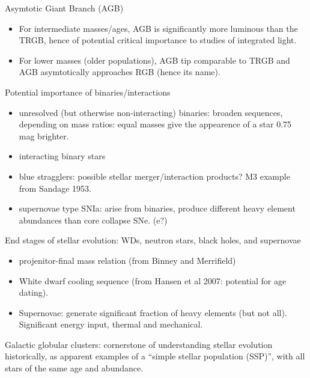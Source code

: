 \documentclass{article}
\begin{document}
    \item Asymtotic Giant Branch (AGB)
        \begin{itemize}
            \item For intermediate masses/ages, AGB is significantly more
                luminous than the TRGB, hence of potential critical importance
                to studies of integrated light.
            \item For lower masses (older populations), AGB tip comparable
                to TRGB and AGB asymtotically approaches RGB (hence its name).
        \end{itemize}
    \item Potential importance of binaries/interactions
        \begin{itemize}
            \item unresolved (but otherwise non-interacting) binaries:
                broaden sequences, depending on mass ratios: equal masses
                give the appearence of a star 0.75 mag brighter.
            \item interacting binary stars
            \item blue stragglers: possible stellar merger/interaction products?
                {M3 example} from Sandage 1953.
            \item supernovae type SNIa: arise from binaries, produce different
                heavy element abundances than core collapse SNe. (e?)
        \end{itemize}
    \item End stages of stellar evolution:
        WDs, neutron stars, black holes, and supernovae
        \begin{itemize}
            \item {projenitor-final mass relation}
                (from Binney and Merrifield)
            \item {White dwarf cooling sequence}
                (from {Hansen et al 2007}: potential for
                age dating).
            \item Supernovae: generate significant fraction of heavy elements
                (but not all). Significant energy input, thermal and mechanical.
        \end{itemize}
    \item Galactic globular clusters: cornerstone of understanding
      stellar evolution historically, as apparent examples of a
      ``simple stellar population (SSP)'', with all stars of the same
      age and abundance.
\end{document}
